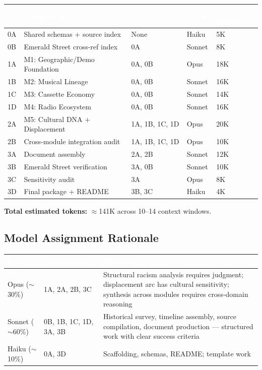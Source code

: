 \documentclass[11pt,letterpaper]{article}
\newcommand{\tableheader}[1]{\textbf{\sffamily\textcolor{white}{#1}}}
\begin{document}
\begin{center}
\begin{tabularx}{\textwidth}{L{1.5cm}L{3.5cm}L{2.5cm}C{1.5cm}C{1.8cm}}
\toprule
{}
\tableheader{ID} & \tableheader{Component} & \tableheader{Dependencies} & \tableheader{Model} & \tableheader{Est. Tokens} \\
\midrule
0A & Shared schemas + source index & None & Haiku & 5K \\
0B & Emerald Street cross-ref index & 0A & Sonnet & 8K \\
1A & M1: Geographic/Demo Foundation & 0A, 0B & Opus & 18K \\
1B & M2: Musical Lineage & 0A, 0B & Sonnet & 16K \\
1C & M3: Cassette Economy & 0A, 0B & Sonnet & 14K \\
1D & M4: Radio Ecosystem & 0A, 0B & Sonnet & 16K \\
2A & M5: Cultural DNA + Displacement & 1A, 1B, 1C, 1D & Opus & 20K \\
2B & Cross-module integration audit & 1A, 1B, 1C, 1D & Opus & 10K \\
3A & Document assembly & 2A, 2B & Sonnet & 12K \\
3B & Emerald Street verification & 3A, 0B & Sonnet & 10K \\
3C & Sensitivity audit & 3A & Opus & 8K \\
3D & Final package + README & 3B, 3C & Haiku & 4K \\
\bottomrule
\end{tabularx}
\end{center}

\textbf{Total estimated tokens:} $\approx$141K across 10--14 context windows.

\subsection{Model Assignment Rationale}

\begin{center}
\begin{tabularx}{\textwidth}{L{2cm}L{3cm}X}
\toprule
{}
\tableheader{Model} & \tableheader{Components} & \tableheader{Rationale} \\
\midrule
Opus ($\sim$30\%) & 1A, 2A, 2B, 3C & Structural racism analysis requires judgment; displacement arc has cultural sensitivity; synthesis across modules requires cross-domain reasoning \\
Sonnet ($\sim$60\%) & 0B, 1B, 1C, 1D, 3A, 3B & Historical survey, timeline assembly, source compilation, document production --- structured work with clear success criteria \\
Haiku ($\sim$10\%) & 0A, 3D & Scaffolding, schemas, README; template work \\
\bottomrule
\end{tabularx}
\end{center}
\end{document}
